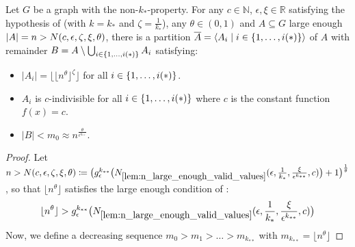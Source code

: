     \begin{theorem}[Theorem 4.23] \label{thm:equitative_partition_high_regularity_parts_grow_with_n}
        Let $G$ be a graph with the non-$k_*$-property.
        For any $c \in \mathbb{N}$, $\epsilon, \xi \in \mathbb{R}$ satisfying the hypothesis of 
        (with $k = k_*$ and $\zeta = \frac{1}{k_*}$), any $\theta \in (0,1)$ and $A \subseteq G$ large enough
        $| A | = n > N( c, \epsilon, \zeta, \xi, \theta )$,
        there is a partition $\overline{A} = \left< A_i \mid i \in \{ 1, \dots, i(*) \} \right>$ of $A$ with remainder
        $B = A \setminus \bigcup_{i \in \{ 1, \dots, i(*) \}} A_i$ satisfying:
        \begin{itemize}
            \item $|A_i| = \lfloor \lfloor n^\theta \rfloor ^\zeta \rfloor$ for all $i \in \{ 1, \dots, i(*) \}$.
            \item $A_i$ is $c$-indivisible for all $i \in \{ 1, \dots, i(*) \}$ where $c$ is the constant function $f(x) = c$.
            \item $|B| < m_0 \approx n^{\frac{\theta}{\epsilon^{k_{**}}}}$. 
        \end{itemize}
        \begin{proof}
            Let $n > N( c, \epsilon, \zeta, \xi, \theta ) \coloneqq \bigl( g_\epsilon^{k_{**}}\bigl( N_{\ref{lem:n_large_enough_valid_values}}
                (  \epsilon, \frac{1}{k_*}, \frac{\xi}{\epsilon^{k_{**}}}, c ) \bigr) + 1  \bigr)^{\frac{1}{\theta}}$,
            so that $\lfloor n^\theta \rfloor$ satisfies the large enough condition of
            :
            \[
                \lfloor n^\theta \rfloor
                    > g_\epsilon^{k_{**}}\bigl( N_{\ref{lem:n_large_enough_valid_values}}
                        ( \epsilon, \frac{1}{k_*}, \frac{\xi}{\epsilon^{k_{**}}}, c ) \bigr)
            \]
            Now, we define a decreasing sequence $m_0 > m_1 > \dots > m_{k_{**}}$ with $m_{k_{**}} = \lfloor n^\theta \rfloor$

\end{proof}
\end{theorem}
